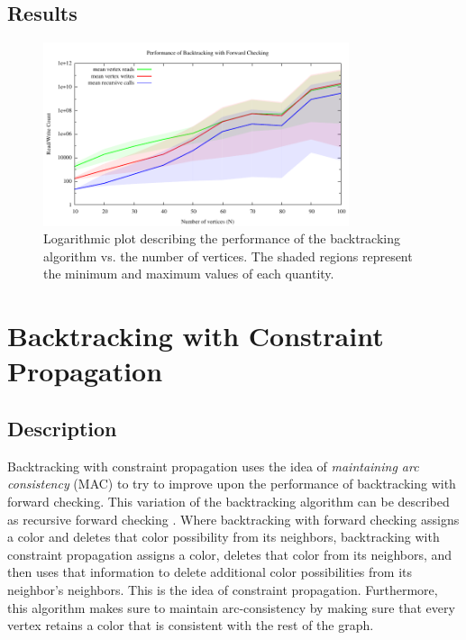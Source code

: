 \documentclass{article}
\begin{document}
	\subsection{Results}
	
		\begin{figure}[h!]
			\centering
			\includegraphics[width=0.8\textwidth]{../results_4/backtracking_forward/bt_forward_performance}
			\caption{Logarithmic plot describing the performance of the backtracking algorithm vs. the number of vertices. The shaded regions represent the minimum and maximum values of each quantity.}
		\end{figure}
	
\section{Backtracking with Constraint Propagation}

	\subsection{Description}
	
		Backtracking with constraint propagation uses the idea of \textit{maintaining arc consistency} (MAC) to try to improve upon the performance of backtracking with forward checking. This variation of the backtracking algorithm can be described as recursive forward checking \cite{ai}. Where backtracking with forward checking assigns a color and deletes that color possibility from its neighbors, backtracking with constraint propagation assigns a color, deletes that color from its neighbors, and then uses that information to delete additional color possibilities from its neighbor's neighbors. This is the idea of constraint propagation. Furthermore, this algorithm makes sure to maintain arc-consistency by making sure that every vertex retains a color that is consistent with the rest of the graph.
	
\end{document}
